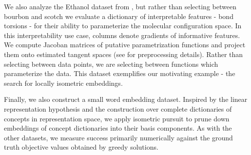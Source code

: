 We also analyze the Ethanol dataset from \citet{Chmiela2018-at, Koelle2022-ju}, but rather than selecting between bourbon and scotch we evaluate a dictionary of interpretable features  - bond torsions - for their ability to parameterize the molecular configuration space.
In this interpretability use case, columns denote gradients of informative features.
We compute Jacoban matrices of putative parametrization functions and project them onto estimated tangent spaces (see \citet{Koelle2022-ju} for preprocessing details).
Rather than selecting between data points, we are selecting between functions which parameterize the data.
This dataset exemplifies our motivating example - the search for locally isometric embeddings.

Finally, we also construct a small word embedding dataset.
Inspired by the linear representation hypothesis \citep{Park2023-hq,Mikolov2013-lt } and the construction over complete dictionaries of concepts in representation space, we apply isometric pursuit to prune down embeddings of concept dictionaries into their basis components.
As with the other datasets, we measure success primarily numerically against the ground truth objective values obtained by greedy solutions.

